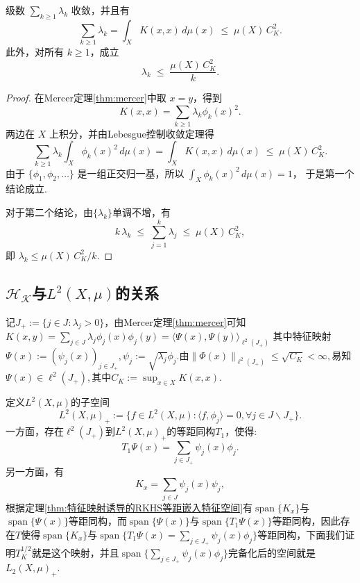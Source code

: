 \documentclass[../master.tex]{subfiles}
\begin{document}
\begin{corollary}
级数 $\sum_{k\geq 1}\lambda_k$ 收敛，并且有
\[
\sum_{k\geq 1}\lambda_k
= \int_X K(x,x)\,d\mu(x)
\;\leq\; \mu(X)\,C_K^2.
\]
此外，对所有 $k\geq 1$，成立
\[
\lambda_k \;\leq\; \frac{\mu(X)\,C_K^2}{k}.
\]
\end{corollary}

\begin{proof}
在Mercer定理\ref{thm:mercer}中取 $x=y$，得到
\[
K(x,x)=\sum_{k\geq 1}\lambda_k \phi_k(x)^2.
\]
两边在 $X$ 上积分，并由Lebesgue控制收敛定理得
\[
\sum_{k\geq 1}\lambda_k\int_X \phi_k(x)^2\,d\mu(x)
=\int_X K(x,x)\,d\mu(x)
\;\leq\;\mu(X)\,C_K^2.
\]
由于 $\{\phi_1,\phi_2,\dots\}$ 是一组正交归一基，所以
\(\int_X \phi_k(x)^2\,d\mu(x)=1\)，
于是第一个结论成立.

对于第二个结论，由$\{\lambda_k\}$单调不增，有
\[
k\,\lambda_k \;\leq\;\sum_{j=1}^k \lambda_j
\;\leq\;\mu(X)\,C_K^2,
\]
即
\(\lambda_k \leq \mu(X)\,C_K^2/k\).
\end{proof}



\subsection{$\mathcal{H_K}$与$L^2(X,\mu)$的关系}
记$J_+:=\{j\in J:\lambda_j>0\}$，由Mercer定理\ref{thm:mercer}可知$K(x,y)=\sum_{j\in J}\lambda_j\phi_j(x)\phi_j(y) = \langle \Psi(x),\Psi(y)\rangle_{\ell^2(J_+)}$
其中特征映射$\Psi(x) := (\psi_j(x))_{j\in J_+},\psi_j:=\sqrt{\lambda_j}\phi_j$.由$\|\Phi(x)\|_{\ell^2(J_+)}\leq \sqrt{C_K}<\infty,$易知$\Psi(x)\in \ell^2(J_+),$其中$C_K:=\sup_{x\in X}K(x,x).$

定义$L^2(X,\mu)$的子空间
\begin{equation*}
    L^2(X,\mu)_+:=\{f\in L^2(X,\mu):\langle f,\phi_j\rangle = 0,\forall j\in J\backslash J_+\}.
\end{equation*}一方面，存在$\ell^2(J_+)$到$L^2(X,\mu)_+$的等距同构$T_1$，使得:
\begin{equation*}
    T_1\Psi(x) = \sum_{j\in J_+}\psi_j(x)\phi_j.
\end{equation*}
另一方面，有
\begin{equation*}
    K_x = \sum_{j\in J}\psi_j(x)\psi_j,
\end{equation*}
根据定理\ref{thm:特征映射诱导的RKHS等距嵌入特征空间}有$\operatorname{span}\{K_x\}$与$\operatorname{span}\{\Psi(x)\}$等距同构，而$\operatorname{span}\{\Psi(x)\}$与$\operatorname{span}\{T_1\Psi(x)\}$等距同构，因此存在$T$使得$\operatorname{span}\{K_x\}$与$\operatorname{span}\{T_1\Psi(x)=\sum_{j\in J_+}\psi_j(x)\phi_j\}$等距同构，下面我们证明$T_K^{1/2}$就是这个映射，并且$\operatorname{span}\{\sum_{j\in J_+}\psi_j(x)\phi_j\}$完备化后的空间就是$L_2(X,\mu)_+.$
\end{document}
